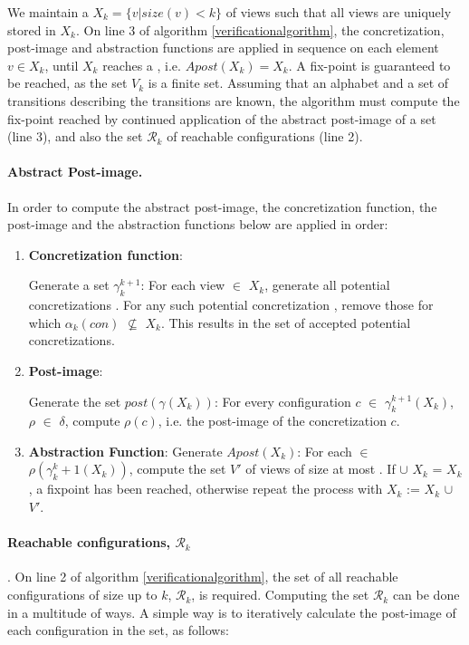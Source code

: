 We maintain a  $X_k = \{v | size(v) < k\}$ of views such that all views are uniquely stored in $X_k$. On line 3 of algorithm \ref{verificationalgorithm}, the concretization, post-image and abstraction functions are applied in sequence on each element $v \in X_k$, until $X_k$ reaches a , i.e. $Apost(X_k) = X_k$. A fix-point is guaranteed to be reached, as the set $V_k$ is a finite set. Assuming that an alphabet and a set of transitions  describing the transitions are known, the algorithm must compute the fix-point reached by continued application of the abstract post-image of a set (line 3), and also the set $\mathcal{R}_k$ of reachable configurations (line 2).


\paragraph{Abstract Post-image.}
In order to compute the abstract post-image, the concretization function, the post-image and the abstraction functions below are applied in order:

\begin{enumerate}
\item
\textbf{Concretization function}:

Generate a set $\gamma_k^{k+1}$: For each view  $\in$ $X_k$, generate all potential concretizations . For any such potential concretization , remove those for which $\alpha_k(con)$ $\not\subseteq$ $X_k$. This results in the set of accepted potential concretizations.

\item
\textbf{Post-image}:

Generate the set $post(\gamma(X_k))$: For every configuration $c$ $\in$ $\gamma_k^{k+1}(X_k)$, $\rho$ $\in$ $\delta$, compute $\rho(c)$, i.e. the post-image of the concretization $c$.

\item
\textbf{Abstraction Function}:
Generate $Apost(X_k)$: For each  $\in$ $\rho(\gamma_k^k+1(X_k))$, compute the set $V'$ of views of size at most . If  $\cup$ $X_k$ = $X_k$, a fixpoint has been reached, otherwise repeat the process with $X_k$ := $X_k$ $\cup$ $V'$.
\end{enumerate}

\paragraph{Reachable configurations, $\mathcal{R}_k$}.
On line 2 of algorithm \ref{verificationalgorithm}, the set of all reachable configurations of size up to $k$, $\mathcal{R}_k$, is required. Computing the set $\mathcal{R}_k$ can be done in a multitude of ways. A simple way is to iteratively calculate the post-image of each configuration in the set, as follows:

